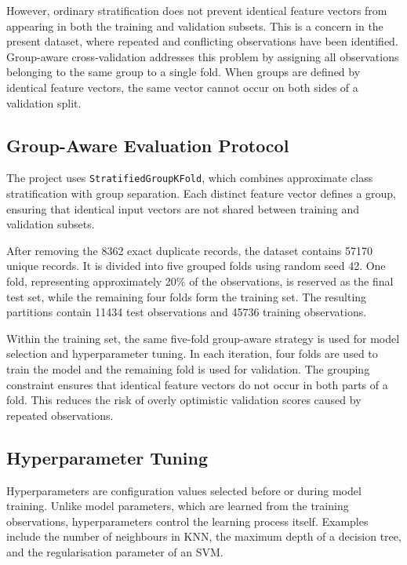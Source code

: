 However, ordinary stratification does not prevent identical feature vectors from appearing in both the training and validation subsets. This is a concern in the present dataset, where repeated and conflicting observations have been identified. Group-aware cross-validation addresses this problem by assigning all observations belonging to the same group to a single fold. When groups are defined by identical feature vectors, the same vector cannot occur on both sides of a validation split.

\subsection{Group-Aware Evaluation Protocol}

The project uses \texttt{StratifiedGroupKFold}, which combines approximate class stratification with group separation. Each distinct feature vector defines a group, ensuring that identical input vectors are not shared between training and validation subsets.

After removing the \num{8362} exact duplicate records, the dataset contains \num{57170} unique records. It is divided into five grouped folds using random seed 42. One fold, representing approximately 20\% of the observations, is reserved as the final test set, while the remaining four folds form the training set. The resulting partitions contain \num{11434} test observations and \num{45736} training observations.

Within the training set, the same five-fold group-aware strategy is used for model selection and hyperparameter tuning. In each iteration, four folds are used to train the model and the remaining fold is used for validation. The grouping constraint ensures that identical feature vectors do not occur in both parts of a fold. This reduces the risk of overly optimistic validation scores caused by repeated observations.

\subsection{Hyperparameter Tuning}

Hyperparameters are configuration values selected before or during model training. Unlike model parameters, which are learned from the training observations, hyperparameters control the learning process itself. Examples include the number of neighbours in KNN, the maximum depth of a decision tree, and the regularisation parameter of an SVM.

